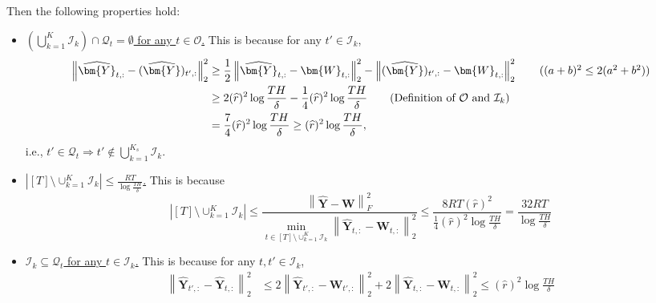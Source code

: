 \documentclass[twoside]{article}
\def\mW{{\bm{W}}}
\def\mY{{\bm{Y}}}
\def\gI{{\mathcal{I}}}
\def\gO{{\mathcal{O}}}
\def\gQ{{\mathcal{Q}}}
\theoremstyle{plain}
\def\bignorm#1{\left\lVert #1 \right\rVert}
\begin{document}
Then the following properties hold:
\begin{itemize}
    \item[(i)] \underline{$\left( \bigcup_{k=1}^K \gI_k \right) \cap \gQ_t = \emptyset$ for any $t \in \gO$.}
    This is because for any $t' \in \gI_k$,
    \begin{align*}
        \bignorm{\widehat{\mY}_{t,:} - (\widehat{\mY})_{t',:}}_2^2
        &\geq \frac{1}{2} \bignorm{\widehat{\mY}_{t,:} - \mW_{t,:}}_2^2 - \bignorm{(\widehat{\mY})_{t',:} - \mW_{t,:}}_2^2 \tag{$(a + b)^2 \leq 2(a^2 + b^2)$} \\
        &\geq 2 (\widehat{r})^2 \log\frac{TH}{\delta} - \frac{1}{4} (\widehat{r})^2 \log\frac{TH}{\delta} \tag{Definition of $\gO$ and $\gI_k$} \\
        &= \frac{7}{4} (\widehat{r})^2 \log\frac{TH}{\delta}
        \geq (\widehat{r})^2 \log\frac{TH}{\delta},
    \end{align*}
    i.e., $t' \in \gQ_t \Rightarrow t' \not\in \bigcup_{k=1}^{K_s} \gI_k$.

    \item[(ii)] \underline{$\left| [T] \setminus \cup_{k=1}^K \gI_k \right| \leq \frac{R T}{\log\frac{TH}{\delta}}$.}
    This is because
    \begin{equation*}
        \left| [T] \setminus \cup_{k=1}^K \gI_k \right| \leq \frac{\bignorm{\widehat{\mY} - \mW}_F^2}{\min_{t \in [T] \setminus \cup_{k=1}^K \gI_k} \bignorm{\widehat{\mY}_{t,:} - \mW_{t,:}}_2^2}
        \leq \frac{8R T  (\widehat{r})^2}{\frac{1}{4} (\widehat{r})^2 \log\frac{TH}{\delta}}
        = \frac{32 R T}{\log\frac{TH}{\delta}}
    \end{equation*}
    
     \item[(iii)] \underline{$\gI_k \subseteq \gQ_t$ for any $t \in \gI_k$.}
    This is because for any $t, t' \in \gI_k$,
    \begin{align*}
        \bignorm{\widehat{\mY}_{t',:} - \widehat{\mY}_{t,:}}_2^2 &\leq 2 \bignorm{\widehat{\mY}_{t',:} - \mW_{t',:}}_2^2 + 2 \bignorm{\widehat{\mY}_{t,:} - \mW_{t,:}}_2^2
        \leq (\widehat{r})^2 \log\frac{TH}{\delta}
    \end{align*}


\end{itemize}
\end{document}
